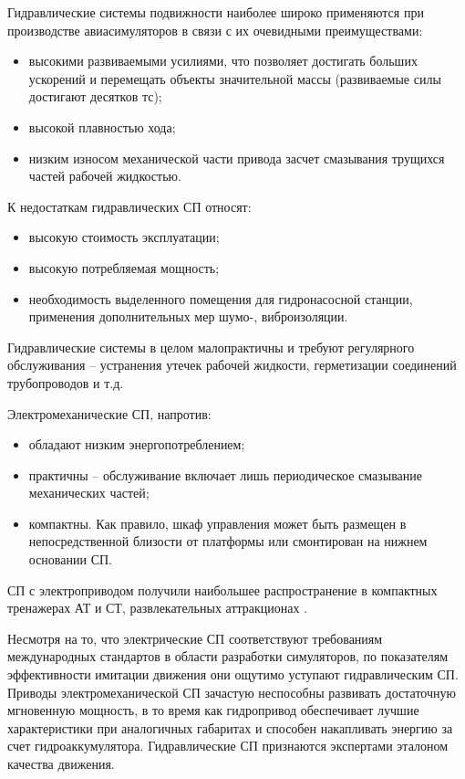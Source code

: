 Гидравлические системы подвижности \cite{Drexel1992,Zeng2014} наиболее широко применяются при производстве авиасимуляторов в связи с их очевидными преимуществами:
\begin{itemize}
\item высокими развиваемыми усилиями, что позволяет достигать больших ускорений и перемещать объекты значительной массы (развиваемые силы достигают десятков тс);
\item высокой плавностью хода;
\item низким износом механической части привода засчет смазывания трущихся частей рабочей жидкостью.
\end{itemize}
К недостаткам гидравлических СП относят:
\begin{itemize}
\item высокую стоимость эксплуатации;
\item высокую потребляемая мощность;
\item необходимость выделенного помещения для гидронасосной станции, применения дополнительных мер шумо-, виброизоляции.
\end{itemize}
Гидравлические системы в целом малопрактичны и требуют регулярного обслуживания -- устранения утечек рабочей жидкости, герметизации соединений трубопроводов и т.д.

Электромеханические СП, напротив:
\begin{itemize}
\item обладают низким энергопотреблением;
\item практичны -- обслуживание включает лишь периодическое смазывание механических частей;
\item компактны. Как правило, шкаф управления может быть размещен в непосредственной близости от платформы или смонтирован на нижнем основании СП.
\end{itemize}

СП с электроприводом получили наибольшее распространение в компактных тренажерах АТ и СТ, развлекательных аттракционах \cite{Cretescu2015, Smit2010}.

Несмотря на то, что электрические СП соответствуют требованиям международных стандартов в области разработки симуляторов, по показателям эффективности имитации движения они ощутимо уступают гидравлическим СП. Приводы электромеханической СП зачастую неспособны развивать достаточную мгновенную мощность, в то время как гидропривод обеспечивает лучшие характеристики при аналогичных габаритах и способен накапливать энергию за счет гидроаккумулятора. Гидравлические СП признаются экспертами эталоном качества движения.

